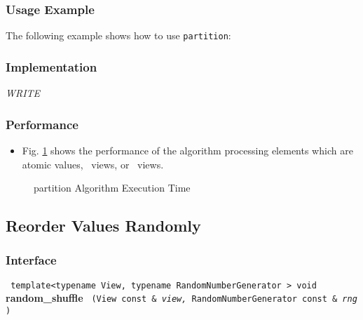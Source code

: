 \subsubsection{Usage Example} %

The following example shows how to use \texttt{partition}:


\subsubsection{Implementation} %

\textit{WRITE}

\subsubsection{Performance} %

\begin{itemize}
\item
Fig. \ref{fig:part-alg-exec-exper}
shows the performance of the algorithm processing
elements which are atomic values, \stl\ views, or \stapl\ views.
\end{itemize}

\begin{figure}[p]
\caption{partition Algorithm Execution Time}
\label{fig:part-alg-exec-exper}
\end{figure}

 
\subsection{Reorder Values Randomly} \label{sec-reord-rand_shuf}

\subsubsection{Interface} %

\noindent
\texttt{%
template<typename View, typename RandomNumberGenerator >
\newline
void 
}
\newline
\textbf{random\_shuffle}%
\texttt{%
(View const \&
\textit{view,}%
RandomNumberGenerator const \&
\textit{rng}%
)
}
\vspace{0.4cm}

